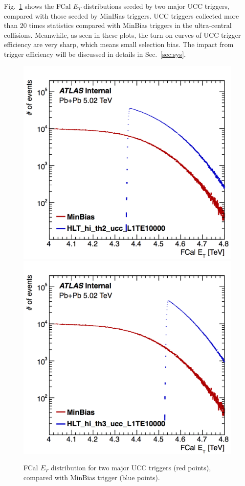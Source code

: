 Fig.~\ref{fig:evtSel_UCC_sts} shows the FCal $E_{T}$ distributions seeded by two major UCC triggers, compared with those seeded by MinBias triggers. UCC triggers collected more than 20 times statistics compared with MinBias triggers in the ultra-central collisions. Meanwhile, as seen in these plots, the turn-on curves of UCC trigger efficiency are very sharp, which means small selection bias. The impact from trigger efficiency will be discussed in details in Sec.~\ref{sec:sys}.
\begin{figure}[H]
\centering
\includegraphics[width=.45\linewidth]{figs/sec_evtSel/PbPb502/UCC_trigSts_3.png}
\includegraphics[width=.45\linewidth]{figs/sec_evtSel/PbPb502/UCC_trigSts_4.png}
\caption{FCal $E_{T}$ distribution for two major UCC triggers (red points), compared with MinBias trigger (blue points).}
\label{fig:evtSel_UCC_sts}
\end{figure}




